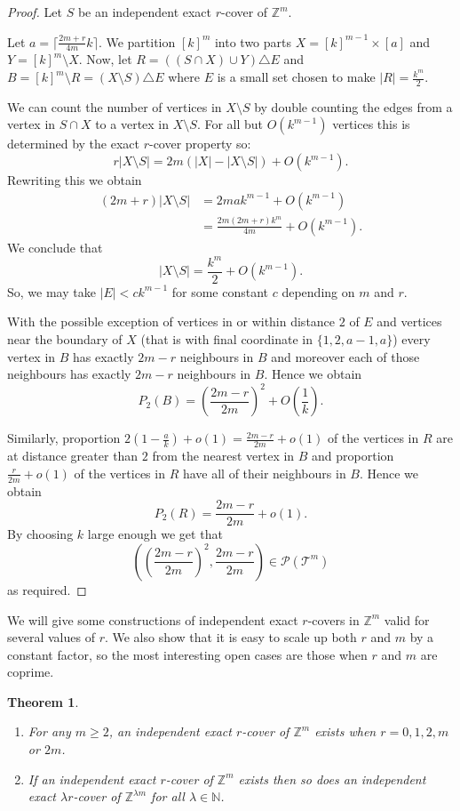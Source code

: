 \documentclass[12pt,a4paper]{article}
\newcommand{\Z}{\mathbb Z}
\newcommand{\N}{\mathbb N}
\newcommand{\T}{\mathcal T}
\newcommand{\Pcal}{\mathcal P}
\newtheorem{thm}{Theorem}
\begin{document}
\begin{proof}
Let $S$ be an independent exact $r$-cover of $\Z^m$.

Let $a=\lceil\frac{2m+r}{4m}k\rceil$. We partition $[k]^m$ into two parts $X=[k]^{m-1}\times[a]$ and $Y=[k]^m\setminus X$. Now, let $R=((S\cap X)\cup Y)\triangle E$ and $B=[k]^m\setminus R=(X\setminus S)\triangle E$ where $E$ is a small set chosen to make $|R|=\frac{k^m}{2}$.

We can count the number of vertices in $X\setminus S$ by double counting the edges from a vertex in $S\cap X$ to a vertex in $X\setminus S$. For all but $O(k^{m-1})$ vertices this is determined by the exact $r$-cover property so:
\[
r|X\setminus S|=2m(|X|-|X\setminus S|)+O(k^{m-1}).
\]
Rewriting this we obtain
\begin{align*}
(2m+r)|X\setminus S|&=2mak^{m-1}+O(k^{m-1})\\
&=\frac{2m(2m+r)k^{m}}{4m}+O(k^{m-1}).
\end{align*}
We conclude that
\[
|X\setminus S|=\frac{k^m}{2}+O(k^{m-1}).
\]
So, we may take $|E|<ck^{m-1}$ for some constant $c$ depending on $m$ and $r$.

With the possible exception of vertices in or within distance $2$ of $E$ and vertices near the boundary of $X$ (that is with final coordinate in $\{1,2,a-1,a\}$) every vertex in $B$ has exactly $2m-r$ neighbours in $B$ and moreover each of those neighbours has exactly $2m-r$ neighbours in $B$. Hence we obtain
\[
P_2(B)=\left(\frac{2m-r}{2m}\right)^2+O\left(\frac{1}{k}\right).
\]

Similarly, proportion $2(1-\frac{a}{k})+o(1)=\frac{2m-r}{2m}+o(1)$ of the vertices in $R$ are at distance greater than $2$ from the nearest vertex in $B$ and 
proportion $\frac{r}{2m}+o(1)$ of the vertices in $R$ have all of their neighbours in $B$. Hence we obtain
\[
P_2(R)=\frac{2m-r}{2m}+o(1).
\]
By choosing $k$ large enough we get that 
\[
\left(\left(\frac{2m-r}{2m}\right)^2,\frac{2m-r}{2m}\right)\in \Pcal(\T^m)
\]
as required.
\end{proof}

We will give some constructions of independent exact $r$-covers in $\Z^m$ valid for several values of $r$. We also show that it is easy to scale up both $r$ and $m$ by a constant factor, so the most interesting open cases are those when $r$ and $m$ are coprime. 

\begin{thm}\label{cover-construction}
\begin{enumerate}
\item For any $m\geq 2$, an independent exact $r$-cover of $\Z^m$ exists when $r=0,1,2,m$ or $2m$.
\item If an independent exact $r$-cover of $\Z^m$ exists then so does an independent exact $\lambda r$-cover of $\Z^{\lambda m}$ for all $\lambda\in\N$.  
\end{enumerate}
\end{thm}
\end{document}
